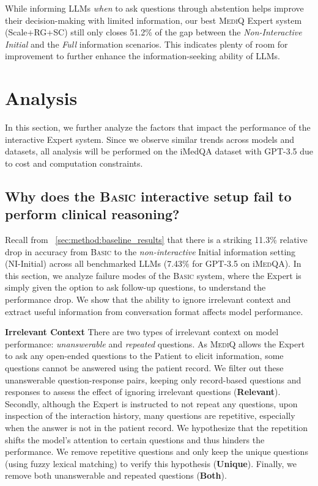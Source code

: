 \documentclass{article}
\newcommand{\Sref}[1]{\textsection~\ref{#1}}
\begin{document}
While informing LLMs \emph{when} to ask questions through abstention helps improve their decision-making with limited information, our best \textsc{MediQ} Expert system (Scale+RG+SC) still only closes 51.2\% of the gap between the \emph{Non-Interactive Initial} and the \emph{Full} information scenarios.
This indicates plenty of room for improvement to further enhance the information-seeking ability of LLMs. 





\vspace{-1mm}
\section{Analysis}\vspace{-1mm}

In this section, we further analyze the factors that impact the performance of the interactive Expert system. Since we observe similar trends across models and datasets, all analysis will be performed on the iMedQA dataset with GPT-3.5 due to cost and computation constraints.

\vspace{-1mm}
\subsection{Why does the \textsc{Basic} interactive setup fail to perform clinical reasoning?}\vspace{-1mm}
Recall from \Sref{sec:method:baseline_results} that there is a striking 11.3\% relative drop in accuracy from \textsc{Basic} to the \emph{non-interactive} Initial information setting (NI-Initial) across all benchmarked LLMs (7.43\% for GPT-3.5 on i\textsc{MedQA}). In this section, we analyze failure modes of the \textsc{Basic} system, where the Expert is simply given the option to ask follow-up questions, to understand the performance drop. We show that the ability to ignore irrelevant context and extract useful information from conversation format affects model performance.%

\textbf{Irrelevant Context}\hspace{3mm}
There are two types of irrelevant context on model performance: \emph{unanswerable} and \emph{repeated} questions.
As \textsc{MediQ} allows the Expert to ask any open-ended questions to the Patient to elicit information, some questions cannot be answered using the patient record.
We filter out these unanswerable question-response pairs, keeping only record-based questions and responses to assess the effect of ignoring irrelevant questions (\textbf{Relevant}).
Secondly, although the Expert is instructed to not repeat any questions, upon inspection of the interaction history, many questions are repetitive, especially when the answer is not in the patient record. We hypothesize that the repetition shifts the model's attention to certain questions and thus hinders the performance. We remove repetitive questions and only keep the unique questions (using fuzzy lexical matching) to verify this hypothesis (\textbf{Unique}). Finally, we remove both unanswerable and repeated questions (\textbf{Both}).%
\end{document}
